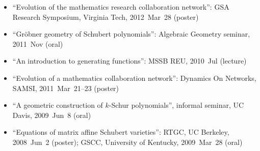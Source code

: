 \documentclass[10pt,a4paper]{article}
\begin{document}
\begin{itemize}[label=$\circ$,nolistsep]
\item
``Evolution of the mathematics research collaboration network'': GSA Research Symposium, Virginia Tech, 2012~Mar~28 (poster)
\item
``Gr\"obner geometry of Schubert polynomials'': Algebraic Geometry seminar, 2011~Nov (oral)
\item
``An introduction to generating functions'': MSSB REU, 2010~Jul (lecture)
\item
``Evolution of a mathematics collaboration network'': Dynamics On Networks, SAMSI, 2011~Mar~21--23 (poster)
\item
``A geometric construction of \(k\)-Schur polynomials'', informal seminar, UC Davis, 2009~Jun~8 (oral)
\item
``Equations of matrix affine Schubert varieties'': RTGC, UC Berkeley, 2008~Jun~2 (poster); GSCC, University of Kentucky, 2009~Mar~28 (oral)
\end{itemize}

\iffalse
\end{document}
